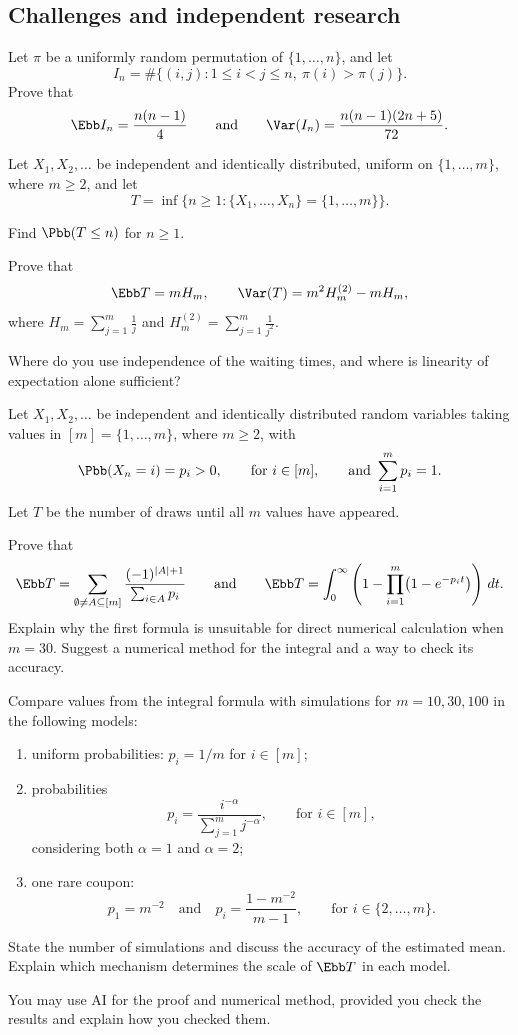 \subsection*{Challenges and independent research}
\begin{problemstar}
Let $\pi$ be a uniformly random permutation of $\{1,\dots,n\}$, and let
\[ I_n=\#\{(i,j):1\le i<j\le n,\ \pi(i)>\pi(j)\}. \]
Prove that
\[ \Ebb I_n=\frac{n(n-1)}4\qquad\text{and}\qquad\Var(I_n)=\frac{n(n-1)(2n+5)}{72}. \]
\end{problemstar}
\begin{problemstar}
Let $X_1,X_2,\dots$ be independent and identically distributed, uniform on
$\{1,\dots,m\}$, where $m\ge2$, and let
\[ T=\inf\{n\ge1:\{X_1,\dots,X_n\}=\{1,\dots,m\}\}. \]
\begin{enumeratea}
  \item Find $\Pbb(T\le n)$ for $n\ge1$.
  \item Prove that
  \[ \Ebb T=mH_m,\qquad\Var(T)=m^2H_m^{(2)}-mH_m, \]
  where $H_m=\sum_{j=1}^m\frac1j$ and $H_m^{(2)}=\sum_{j=1}^m\frac1{j^2}$.
\end{enumeratea}
Where do you use independence of the waiting times, and where is linearity of expectation alone sufficient?
\end{problemstar}
\begin{researchtask}
Let $X_1,X_2,\dots$ be independent and identically distributed random variables
taking values in $[m]=\{1,\dots,m\}$, where $m\ge2$, with
\[
\Pbb(X_n=i)=p_i>0,\qquad\text{for }i\in[m],
\qquad\text{and }\sum_{i=1}^m p_i=1.
\]
Let $T$ be the number of draws until all $m$ values have appeared.
\begin{enumeratea}
  \item Prove that
  \[
  \Ebb T=\sum_{\emptyset\ne A\subseteq[m]}\frac{(-1)^{|A|+1}}{\sum_{i\in A}p_i}
  \qquad\text{and}\qquad
  \Ebb T=\int_0^\infty\left(1-\prod_{i=1}^m\bigl(1-e^{-p_it}\bigr)\right)\,dt.
  \]
  Explain why the first formula is unsuitable for direct numerical calculation
  when $m=30$. Suggest a numerical method for the integral and a way to check its accuracy.
  \item Compare values from the integral formula with simulations for $m=10,30,100$
  in the following models:
  \begin{enumerate}[label=(\roman*)]
    \item uniform probabilities: $p_i=1/m$ for $i\in[m]$;
    \item probabilities
    \[ p_i=\frac{i^{-\alpha}}{\sum_{j=1}^m j^{-\alpha}},\qquad\text{for }i\in[m], \]
    considering both $\alpha=1$ and $\alpha=2$;
    \item one rare coupon:
    \[ p_1=m^{-2}\quad\text{and}\quad p_i=\frac{1-m^{-2}}{m-1},\qquad\text{for }i\in\{2,\dots,m\}. \]
  \end{enumerate}
  State the number of simulations and discuss the accuracy of the estimated mean.
  Explain which mechanism determines the scale of $\Ebb T$ in each model.
\end{enumeratea}
You may use AI for the proof and numerical method, provided you check the results
and explain how you checked them.
\end{researchtask}
